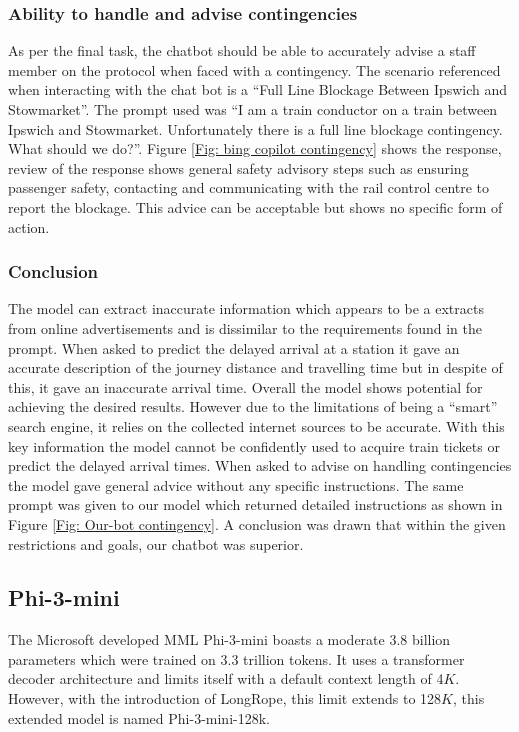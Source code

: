 \subsubsection{Ability to handle and advise contingencies}\label{Sec: co-pilot contingencies}
As per the final task, the chatbot should be able to accurately advise a staff member on the protocol when faced with a contingency. The scenario referenced when interacting with the chat bot is a ``Full Line Blockage Between Ipswich and Stowmarket''. The prompt used was ``I am a train conductor on a train between Ipswich and Stowmarket. Unfortunately there is a full line blockage contingency. What should we do?''. Figure \ref{Fig: bing copilot contingency} shows the response, review of the response shows general safety advisory steps such as ensuring passenger safety, contacting and communicating with the rail control centre to report the blockage. This advice can be acceptable but shows no specific form of action.

\subsubsection{Conclusion}
The model can extract inaccurate information which appears to be a extracts from online advertisements and is dissimilar to the requirements found in the prompt. When asked to predict the delayed arrival at a station it gave an accurate description of the journey distance and travelling time but in despite of this, it gave an inaccurate arrival time. Overall the model shows potential for achieving the desired results. However due to the limitations of being a ``smart'' search engine, it relies on the collected internet sources to be accurate. %
With this key information the model cannot be confidently used to acquire train tickets or predict the delayed arrival times. When asked to advise on handling contingencies the model gave general advice without any specific instructions. The same prompt was given to our model which returned detailed instructions as shown in Figure \ref{Fig: Our-bot contingency}. A conclusion was drawn that within the given restrictions and goals, our chatbot was superior.


\subsection{Phi-3-mini}
The Microsoft developed MML Phi-3-mini boasts a moderate 3.8 billion parameters which were trained on 3.3 trillion tokens. It uses a transformer decoder architecture and limits itself with a default context length of 4$K$. However, with the introduction of LongRope, this limit extends to 128$K$, this extended model is named Phi-3-mini-128k. %
